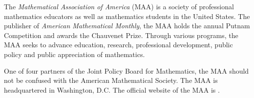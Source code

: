 \documentclass[12pt]{article}
\begin{document}

The {\em Mathematical Association of America} (MAA) is a society of professional mathematics educators as well as mathematics students in the United States. The publisher of {\it American Mathematical Monthly}, the MAA holds the annual Putnam Competition and awards the Chauvenet Prize. Through various programs, the MAA seeks to advance education, research, professional development, public policy and public appreciation of mathematics.

One of four partners of the Joint Policy Board for Mathematics, the MAA should not be confused with the American Mathematical Society. The MAA is headquartered in Washington, D.C. The official website of the MAA is .
\end{document}
